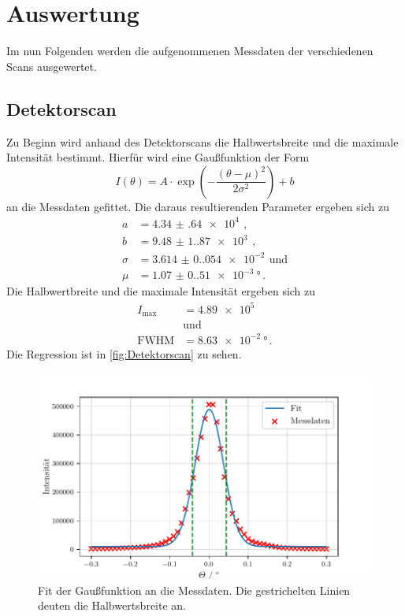 \section{Auswertung}
\label{sec:Auswertung}

Im nun Folgenden werden die aufgenommenen Messdaten der verschiedenen Scans ausgewertet. 


\subsection{Detektorscan}
\label{sec:Detektorscan}

Zu Beginn wird anhand des Detektorscans die Halbwertsbreite und die maximale Intensität bestimmt.
Hierfür wird eine Gaußfunktion der Form
\begin{equation}
    I(\theta)= A \cdot \exp \left(-\frac{(\theta-\mu)^2}{2 \sigma^2}\right)+b
\end{equation}
an die Messdaten gefittet.
Die daraus resultierenden Parameter ergeben sich zu 
\begin{align*}
    a & = \qty{4.34(64)e4}{} \, , \\
    b & = \qty{9.48(1.87)e3}{} \, , \\
    \sigma & = \qty{3.614(0.054)e-2}{} \, \text{und} \\
    \mu & = \qty{1.07(0.51)e-3}{\degree} \, .
\end{align*}
Die Halbwertbreite und die maximale Intensität ergeben sich zu
\begin{align*}
    I_\text{max} &= \qty{4.89e5}{} \\
    &\text{und} \\
    \text{FWHM} &= \qty{8.63e-2}{\degree} \, .
\end{align*}
Die Regression ist in \autoref{fig:Detektorscan} zu sehen.
\begin{figure}
    \centering
    \includegraphics[width = 0.65 \linewidth]{build/Detektorscan.pdf}
    \caption{Fit der Gaußfunktion an die Messdaten.
    Die gestrichelten Linien deuten die Halbwertsbreite an.}
    \label{fig:Detektorscan}
\end{figure}

